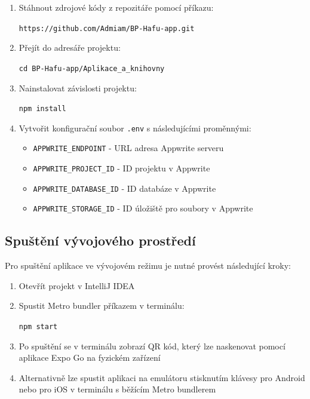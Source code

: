 \documentclass[czech, bp, kiv, he, iso690numb, pdf]{fasthesis}
\begin{document}
    \begin{enumerate}
        \item Stáhnout zdrojové kódy z repozitáře pomocí příkazu:

        \texttt{https://github.com/Admiam/BP-Hafu-app.git}

        \item Přejít do adresáře projektu:

        \texttt{cd BP-Hafu-app/Aplikace\_a\_knihovny}

        \item Nainstalovat závislosti projektu:

        \texttt{npm install}

        \item Vytvořit konfigurační soubor \texttt{.env} s následujícími proměnnými:
        \begin{itemize}
            \item \texttt{APPWRITE\_ENDPOINT} - URL adresa Appwrite serveru
            \item \texttt{APPWRITE\_PROJECT\_ID} - ID projektu v Appwrite
            \item \texttt{APPWRITE\_DATABASE\_ID} - ID databáze v Appwrite
            \item \texttt{APPWRITE\_STORAGE\_ID} - ID úložiště pro soubory v Appwrite
        \end{itemize}
    \end{enumerate}

    \subsection{Spuštění vývojového prostředí}
    \label{subsec:dev-environment}

    Pro spuštění aplikace ve vývojovém režimu je nutné provést následující kroky:

    \begin{enumerate}
        \item Otevřít projekt v IntelliJ IDEA
        \item Spustit Metro bundler příkazem v terminálu:

        \texttt{npm start}

        \item Po spuštění se v terminálu zobrazí QR kód, který lze naskenovat pomocí aplikace Expo Go na fyzickém zařízení
        \item Alternativně lze spustit aplikaci na emulátoru stisknutím klávesy  pro Android nebo  pro iOS v terminálu s běžícím Metro bundlerem
    \end{enumerate}
\end{document}
